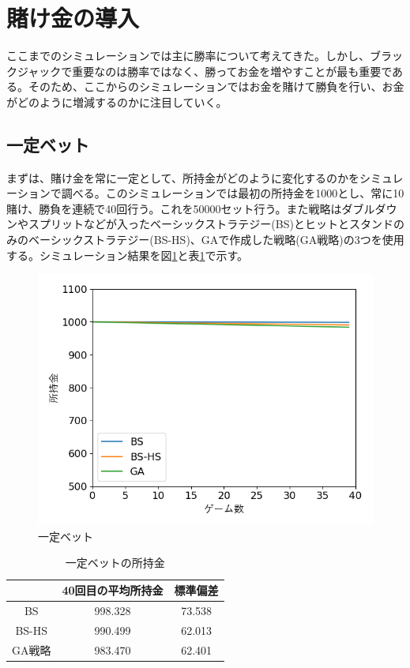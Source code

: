 \section{賭け金の導入}
ここまでのシミュレーションでは主に勝率について考えてきた。しかし、ブラックジャックで重要なのは勝率ではなく、勝ってお金を増やすことが最も重要である。そのため、ここからのシミュレーションではお金を賭けて勝負を行い、お金がどのように増減するのかに注目していく。
\subsection{一定ベット}
まずは、賭け金を常に一定として、所持金がどのように変化するのかをシミュレーションで調べる。このシミュレーションでは最初の所持金を1000とし、常に10賭け、勝負を連続で40回行う。これを50000セット行う。また戦略はダブルダウンやスプリットなどが入ったベーシックストラテジー(BS)とヒットとスタンドのみのベーシックストラテジー(BS-HS)、GAで作成した戦略(GA戦略)の3つを使用する。シミュレーション結果を図\ref{betdife}と表\ref{bet}で示す。
\begin{figure}[H]
 \begin{center} 
  \includegraphics[width=0.7\linewidth]{./figure/bet-defineite-ver5}
  \caption{一定ベット\label{betdife}}
 \end{center}
\end{figure}

\begin{table}[H]
 \caption{一定ベットの所持金\label{bet}}
 \begin{center}
  \begin{tabular}{|c|c|c|}
  \hline  & 40回目の平均所持金 & 標準偏差 \\
  \hline BS & 998.328 & 73.538\\
  \hline BS-HS & 990.499 & 62.013 \\
  \hline GA戦略 & 983.470 & 62.401\\
  \hline
  \end{tabular}
 \end{center}
\end{table}

